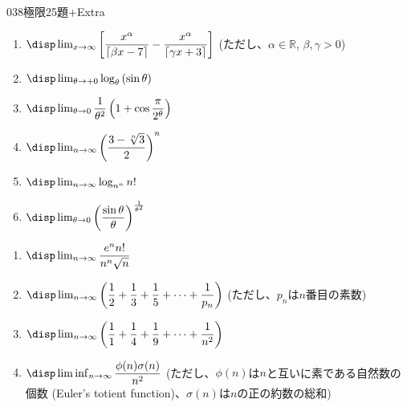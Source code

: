 \begin{prob}{038}{}{極限25題+Extra}
\begin{enumerate}
  \item $\disp \lim_{x\to\infty} \left[\dfrac{x^\alpha}{\left\lceil\beta x-7\right\rceil}-\dfrac{x^\alpha}{\left\lceil\gamma x+3\right\rceil}\right]$ (ただし、$\alpha\in\mathbb{R}$, $\beta, \gamma>0$)
  \item $\disp \lim_{\theta\to +0} \log_\theta \left(\sin\theta\right)$
  \item $\disp \lim_{\theta\to 0} \dfrac{1}{\theta^2}\left(1+\cos\dfrac{\pi}{2^\theta}\right)$
  \item $\disp \lim_{n\to\infty} \left(\dfrac{3-\sqrt[n]{3}}{2}\right)^n$
  \item $\disp \lim_{n\to\infty} \log_{n^n}n!$
  \item $\disp \lim_{\theta\to 0} \left(\dfrac{\sin\theta}{\theta}\right)^{\frac{1}{\theta^2}}$
 \end{enumerate}
 \begin{enumerate}
  \renewcommand{\labelenumi}{Ex\arabic{enumi}}
  \item $\disp \lim_{n\to\infty} \dfrac{e^nn!}{n^n\sqrt{n}}$
  \item $\disp \lim_{n\to\infty} \left(\dfrac{1}{2}+\dfrac{1}{3}+\dfrac{1}{5}+\cdots+\dfrac{1}{p_n}\right)$ (ただし、$p_n$は$n$番目の素数)
  \item $\disp \lim_{n\to\infty} \left(\dfrac{1}{1}+\dfrac{1}{4}+\dfrac{1}{9}+\cdots+\dfrac{1}{n^2}\right)$
  \item $\disp \liminf_{n\to\infty} \dfrac{\phi(n)\sigma(n)}{n^2}$ (ただし、$\phi(n)$は$n$と互いに素である自然数の個数 (Euler's totient function)、$\sigma(n)$は$n$の正の約数の総和)
 \end{enumerate}
\end{prob}


